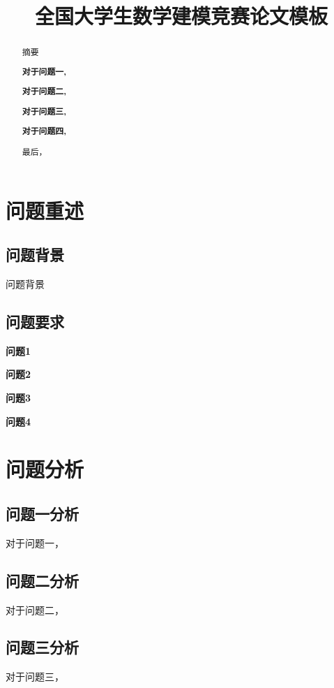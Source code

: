 \documentclass{cumcmthesis}
\title{全国大学生数学建模竞赛论文模板}  %
\begin{document}
\maketitle

\begin{abstract}
摘要

\textbf{对于问题一,}

\textbf{对于问题二,}

\textbf{对于问题三,}

\textbf{对于问题四,}

最后，



\end{abstract}

\section{问题重述}
\subsection{问题背景}
问题背景


\subsection{问题要求}

\textbf{问题1}  

\textbf{问题2}  

\textbf{问题3} 

\textbf{问题4}  


\section{问题分析}
\subsection{问题一分析}
对于问题一，

\subsection{问题二分析}	
对于问题二，

\subsection{问题三分析}
对于问题三，
\end{document}
